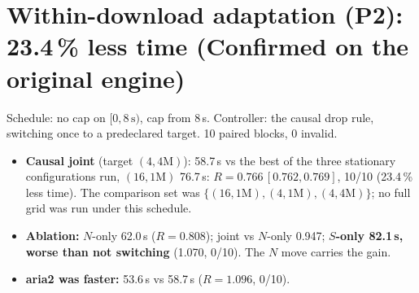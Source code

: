 \section{Within-download adaptation (P2): 23.4\,\% less time (Confirmed on the original engine)}
Schedule: no cap on $[0, 8\,\text{s})$, cap from 8\,s. Controller: the causal drop rule, switching once to a predeclared target. 10 paired blocks, 0 invalid.
\begin{itemize}
\item \textbf{Causal joint} (target $(4,4\text{M})$): 58.7\,s vs the best of the three stationary configurations run, $(16,1\text{M})$ 76.7\,s: $R=0.766\,[0.762, 0.769]$, 10/10 (23.4\,\% less time). The comparison set was $\{(16,1\text{M}), (4,1\text{M}), (4,4\text{M})\}$; no full grid was run under this schedule.
\item \textbf{Ablation:} $N$-only 62.0\,s ($R=0.808$); joint vs $N$-only 0.947; \textbf{$S$-only 82.1\,s, worse than not switching} (1.070, 0/10). The $N$ move carries the gain.
\item \textbf{aria2 was faster:} 53.6\,s vs 58.7\,s ($R=1.096$, 0/10).
\end{itemize}

